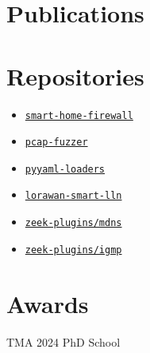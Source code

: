 \documentclass[]{deedy-resume-openfont}
\begin{document}
%
%

\begin{minipage}[t]{0.35\textwidth} 


\section{Publications}
\vspace{0.7cm}
\renewcommand\refname{\vskip -1.5cm} %


\nocite{*}



\section{Repositories}
\renewcommand\refname{\vskip -1.5cm} %
\begin{itemize}
    \item \href{https://github.com/smart-home-network-security/smart-home-firewall}{\texttt{smart-home-firewall}}
    \item \href{https://github.com/smart-home-network-security/pcap-fuzzer}{\texttt{pcap-fuzzer}}
    \item \href{https://github.com/smart-home-network-security/pyyaml-loaders}{\texttt{pyyaml-loaders}}
    \item \href{https://github.com/fdekeers/lorawan-smart-lln}{\texttt{lorawan-smart-lln}}
    \item \href{https://github.com/zeek-plugins/mdns}{\texttt{zeek-plugins/mdns}}
    \item \href{https://github.com/zeek-plugins/igmp}{\texttt{zeek-plugins/igmp}}
\end{itemize}



\section{Awards}
\renewcommand\refname{\vskip -1.5cm} %
TMA 2024 PhD School\\
\vspace{8pt}



\end{minipage}
\end{document}
